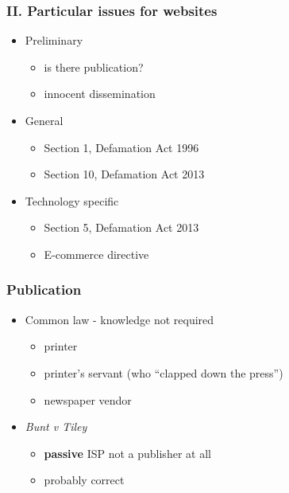 \documentclass[ignorenonframetext,]{beamer}
\begin{document}
\begin{frame}
\frametitle{II. Particular issues for websites}
\begin{itemize}
\item Preliminary
  \begin{itemize}
  \item is there publication?
  \item innocent dissemination
  \end{itemize}
\item General
  \begin{itemize}
  \item Section 1, Defamation Act 1996
  \item Section 10, Defamation Act 2013
  \end{itemize}
\item Technology specific
  \begin{itemize}
  \item Section 5, Defamation Act 2013
  \item E-commerce directive
  \end{itemize}
\end{itemize}
\end{frame}


\begin{frame}
\frametitle{Publication}

\begin{itemize}
\item Common law - knowledge not required
  \begin{itemize}
  \item printer
  \item printer's servant (who ``clapped down the press'')
  \item newspaper vendor
  \end{itemize}
\item {\it Bunt v Tiley}
  \begin{itemize}
  \item {\bf passive} ISP not a publisher at all 
  \item probably correct
  \end{itemize}
\end{itemize}

\end{frame}
\end{document}
